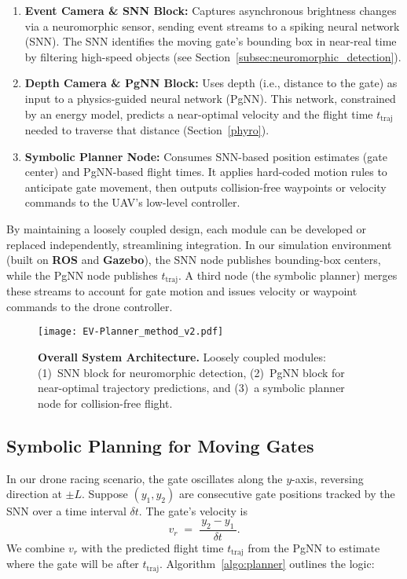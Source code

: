 \begin{enumerate}
    \item \textbf{Event Camera \& SNN Block:}  
          Captures asynchronous brightness changes via a neuromorphic sensor, sending event streams to a spiking neural network (SNN). The SNN identifies the moving gate’s bounding box in near-real time by filtering high-speed objects (see Section~\ref{subsec:neuromorphic_detection}).

    \item \textbf{Depth Camera \& PgNN Block:}  
          Uses depth (i.e., distance to the gate) as input to a physics-guided neural network (PgNN). This network, constrained by an energy model, predicts a near-optimal velocity and the flight time \( t_{\mathrm{traj}} \) needed to traverse that distance (Section~\ref{phyro}).

    \item \textbf{Symbolic Planner Node:}  
          Consumes SNN-based position estimates (gate center) and PgNN-based flight times. It applies hard-coded motion rules to anticipate gate movement, then outputs collision-free waypoints or velocity commands to the UAV’s low-level controller.
\end{enumerate}

By maintaining a loosely coupled design, each module can be developed or replaced independently, streamlining integration. In our simulation environment (built on \textbf{ROS} and \textbf{Gazebo}), the SNN node publishes bounding-box centers, while the PgNN node publishes \( t_{\mathrm{traj}} \). A third node (the symbolic planner) merges these streams to account for gate motion and issues velocity or waypoint commands to the drone controller.

\begin{figure}[!t]
\centering
\texttt{[image: EV-Planner\_method\_v2.pdf]}
\caption{
    \textbf{Overall System Architecture.} 
    Loosely coupled modules: 
    (1)~SNN block for neuromorphic detection, 
    (2)~PgNN block for near-optimal trajectory predictions, 
    and (3)~a symbolic planner node for collision-free flight.
}
\label{fig:method}
\end{figure}
\subsection{Symbolic Planning for Moving Gates}
\label{symbol}

In our drone racing scenario, the gate oscillates along the \( y\)-axis, reversing direction at \(\pm L\). Suppose \((y_1,y_2)\) are consecutive gate positions tracked by the SNN over a time interval \(\delta t\). The gate’s velocity is
\[
    v_r \;=\; \frac{\,y_2 - y_1\,}{\delta t}.
\]
We combine \( v_r \) with the predicted flight time \( t_{\mathrm{traj}} \) from the PgNN to estimate where the gate will be after \( t_{\mathrm{traj}} \). Algorithm~\ref{algo:planner} outlines the logic:

